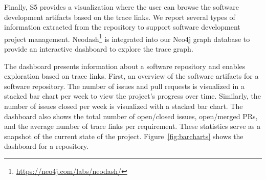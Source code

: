 








Finally, \textsf{S5} provides a visualization where the user can browse the software development artifacts based on the trace links. 
We report several types of information extracted from the repository to support software development project management. 
Neodash\footnote{\url{https://neo4j.com/labs/neodash/}} is integrated into our Neo4j graph database to provide an interactive dashboard to explore the trace graph.

The dashboard presents information about a software repository and enables exploration based on trace links.
First, an overview of the software artifacts for a software repository.  
The number of issues and pull requests is visualized in a stacked bar chart per week to view the project's progress over time. 
Similarly, the number of  issues closed per week is visualized with a stacked bar chart. 
The dashboard also shows the total number of open/closed issues, open/merged PRs, and the average number of trace links per requirement. 
These statistics serve as a snapshot of the current state of the project. 
Figure~\ref{fig:barcharts} shows the dashboard for a repository.

